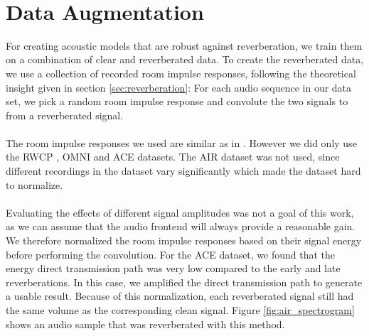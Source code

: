 \begin{minipage}{\linewidth}
	\label{fig:final_tdnn}
	\vspace{5mm}
\end{minipage}\\
\section{Data Augmentation}
For creating acoustic models that are robust against reverberation, we train them on a combination of clear and reverberated data. To create the reverberated data, we use a collection of recorded room impulse responses, following the theoretical insight given in section \ref{sec:reverberation}: For each audio sequence in our data set, we pick a random room impulse response and convolute the two signals to from a reverberated signal. \\ \\
The room impulse responses we used are similar as in \cite{ritter2016training}. However we did only use the RWCP \cite{nakamura2000acoustical}, OMNI \cite{stewart2010database} and ACE \cite{eaton2015ace} datasets. The AIR dataset \cite{jeub2009binaural} was not used, since different recordings in the dataset vary significantly which made the dataset hard to normalize.\\ \\
Evaluating the effects of different signal amplitudes was not a goal of this work, as we can assume that the audio frontend will always provide a reasonable gain. We therefore normalized the room impulse responses based on their signal energy before performing the convolution. For the ACE dataset, we found that the energy direct transmission path was very low compared to the early and late reverberations. In this case, we amplified the direct transmission path to generate a usable result. Because of this normalization, each reverberated signal still had the same volume as the corresponding clean signal. 
Figure \ref{fig:air_spectrogram} shows an audio sample that was reverberated with this method. 
